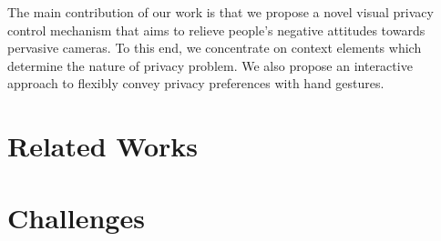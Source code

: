 The main contribution of our work is that we propose a novel visual privacy control mechanism that aims to relieve people's negative attitudes towards pervasive cameras.
To this end, we concentrate on context elements which determine the nature of privacy problem.
We also propose an interactive approach to flexibly convey privacy preferences with hand gestures.


\section{Related Works}

\section{Challenges}

\newpage
